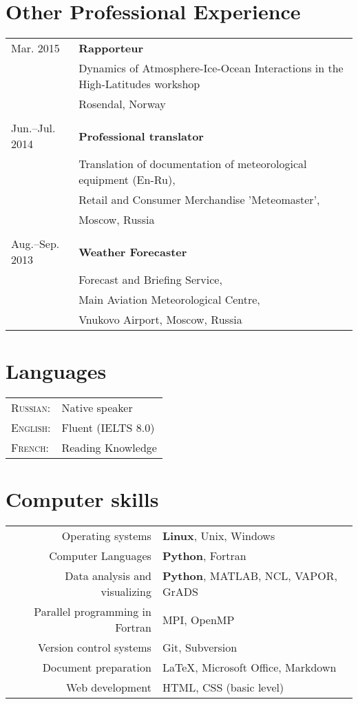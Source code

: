 \documentclass[a4paper,11pt]{article}
\newlength{\mycol}
\begin{document}
\section{Other Professional Experience}
\begin{tabu} to 
 {\small Mar.} 2015 & \textbf{Rapporteur} \\
& Dynamics of Atmosphere-Ice-Ocean Interactions in the High-Latitudes workshop \\
& Rosendal, Norway \\
 \\

 {\small Jun.--Jul.} 2014 & \textbf{Professional translator} \\
& Translation of documentation of meteorological equipment (En-Ru), \\
& Retail and Consumer Merchandise 'Meteomaster', \\
& Moscow, Russia \\
 \\

 {\small Aug.--Sep.} 2013 & \textbf{Weather Forecaster} \\
& Forecast and Briefing Service, \\
& Main Aviation Meteorological Centre, \\
& Vnukovo Airport, Moscow, Russia
\end{tabu}

\section{Languages}
\begin{tabu} to 
\textsc{Russian:} & Native speaker \\
\textsc{English:} & Fluent (IELTS 8.0)\\
\textsc{French:} & Reading Knowledge\\
\end{tabu}

\section{Computer skills}
\begin{tabular}{rp{10cm}}
	Operating systems & \textbf{Linux}, Unix, Windows \\
	Computer Languages & \textbf{Python}, Fortran \\
	Data analysis and visualizing & \textbf{Python}, MATLAB, NCL, VAPOR, GrADS \\
	Parallel programming in Fortran & MPI, OpenMP \\
	Version control systems & Git, Subversion \\
	Document preparation & \LaTeX, Microsoft Office, Markdown \\
	Web development & HTML, CSS (basic level)
\end{tabular}
\end{document}
